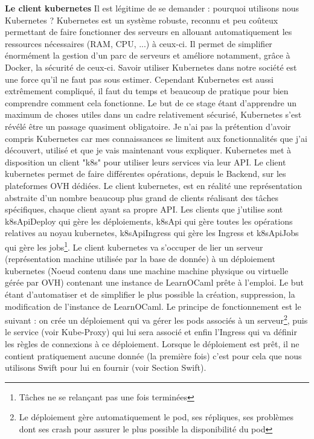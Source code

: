 \documentclass{article}
\begin{document}
\textbf{Le client kubernetes}
\newline
\newline
Il est légitime de se demander : pourquoi utilisons nous Kubernetes ?
\newline
Kubernetes est un système robuste, reconnu et peu coûteux permettant de faire fonctionner des serveurs en allouant automatiquement les ressources nécessaires (RAM, CPU, ...) à ceux-ci. Il permet de simplifier énormément la gestion d'un parc de serveurs et améliore notamment, grâce à Docker, la sécurité de ceux-ci.
\newline
Savoir utiliser Kubernetes dans notre société est une force qu'il ne faut pas sous estimer. Cependant Kubernetes est aussi extrêmement compliqué, il faut du temps et beaucoup de pratique pour bien comprendre comment cela fonctionne.
\newline
Le but de ce stage étant d'apprendre un maximum de choses utiles dans un cadre relativement sécurisé, Kubernetes s'est révélé être un passage quasiment obligatoire. Je n'ai pas la prétention d'avoir compris Kubernetes car mes connaissances se limitent aux fonctionnalités que j'ai découvert, utilisé et que je vais maintenant vous expliquer.
\newline
Kubernetes met à disposition un client "k8s" pour utiliser leurs services via leur API.
\newline
Le client kubernetes permet de faire différentes opérations, depuis le Backend, sur les plateformes OVH dédiées.
\newline
Le client kubernetes, est en réalité une représentation abstraite d'un nombre beaucoup plus grand de clients réalisant des tâches spécifiques, chaque client ayant sa propre API.
\newline
Les clients que j'utilise sont k8sApiDeploy qui gère les déploiements, k8sApi qui gère toutes les opérations relatives au noyau kubernetes, k8sApiIngress qui gère les Ingress et k8sApiJobs qui gère les jobs\footnote{Tâches ne se relançant pas une fois terminées}.
\newline
Le client kubernetes va s'occuper de lier un serveur (représentation machine utilisée par la base de donnée) à un déploiement kubernetes (Noeud contenu dans une machine machine physique ou virtuelle gérée par OVH) contenant une instance de LearnOCaml prête à l'emploi. Le but étant d'automatiser et de simplifier le plus possible la création, suppression, la modification de l'instance de LearnOCaml.
\newline
Le principe de fonctionnement est le suivant : on crée un déploiement qui va gérer les pods associés à un serveur\footnote{Le déploiement gère automatiquement le pod, ses répliques, ses problèmes dont ses crash pour assurer le plus possible la disponibilité du pod}, puis le service (voir Kube-Proxy) qui lui sera associé et enfin l'Ingress qui va définir les règles de connexions à ce déploiement. Lorsque le déploiement est prêt, il ne contient pratiquement aucune donnée (la première fois) c'est pour cela que nous utilisons Swift pour lui en fournir (voir Section Swift).
\end{document}
